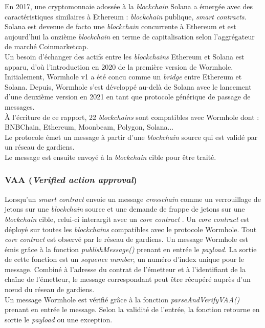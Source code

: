 En 2017, une cryptomonnaie adossée à la \textit{blockchain} Solana a émergée avec des caractéristiques
similaires à Ethereum : \textit{blockchain} publique, \textit{smart contracts}.\\
Solana est devenue de facto une \textit{blockchain} concurrente à Ethereum et est aujourd'hui 
la onzième \textit{blockchain} en terme de capitalisation selon l'aggrégateur de marché Coinmarketcap.\\
Un besoin d'échanger des actifs entre les \textit{blockchains} Ethereum et Solana est apparu, 
d'où l'introduction en 2020 de la première version de Wormhole.
Initialement, Wormhole v1 a été concu comme un \textit{bridge} entre Ethereum et Solana.
Depuis, Wormhole s'est développé au-delà de Solana avec le lancement d'une deuxième version en 2021 
en tant que protocole générique de passage de messages.\\
À l'écriture de ce rapport, 22 \cite{wormholeNetwork} \textit{blockchains} sont compatibles avec Wormhole 
dont : BNBChain, Ethereum, Moonbeam, Polygon, Solana...\\
Le protocole émet un message à partir d'une \textit{blockchain} source qui est validé par un réseau de 
gardiens.\\ 
Le message est ensuite envoyé à la \textit{blockchain} cible pour être traité.

\subsubsection{VAA (\textit{Verified action approval})}

Lorsqu'un \textit{smart contract} envoie un message \textit{crosschain} comme un verrouillage
de jetons sur une \textit{blockchain} source et une demande de frappe de jetons sur une 
\textit{blockchain} cible, celui-ci interargit avec un \textit{core contract} \cite{wormholeCoreContract}.
Un \textit{core contract} est déployé sur toutes les \textit{blockchains} compatibles avec le protocole 
Wormhole. Tout \textit{core contract} est observé par le réseau de gardiens.
Un message Wormhole est émis grâce à la fonction \textit{publishMessage()} prenant en entrée le \textit{payload}.
La sortie de cette fonction est un \textit{sequence number}, un numéro d'index unique pour le message.
Combiné à l'adresse du contrat de l'émetteur et à l'identifiant de la chaîne de l'émetteur, le message 
correspondant peut être récupéré auprès d'un nœud du réseau de gardiens.\\
Un message Wormhole est vérifié grâce à la fonction \textit{parseAndVerifyVAA()} prenant en entrée le message.
Selon la validité de l'entrée, la fonction retourne en sortie le \textit{payload} ou une exception.
\newpage

